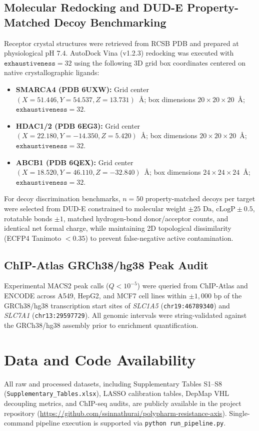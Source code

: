 \documentclass[11pt,a4paper]{article}
\begin{document}
\subsection{Molecular Redocking and DUD-E Property-Matched Decoy Benchmarking}
Receptor crystal structures were retrieved from RCSB PDB and prepared at physiological pH $7.4$. AutoDock Vina (v1.2.3) redocking was executed with $\texttt{exhaustiveness} = 32$ using the following 3D grid box coordinates centered on native crystallographic ligands:
\begin{itemize}
    \item \textbf{SMARCA4 (PDB 6UXW):} Grid center $(X = 51.446, Y = 54.537, Z = 13.731)$~\AA; box dimensions $20 \times 20 \times 20$~\AA; $\texttt{exhaustiveness} = 32$.
    \item \textbf{HDAC1/2 (PDB 6EG3):} Grid center $(X = 22.180, Y = -14.350, Z = 5.420)$~\AA; box dimensions $20 \times 20 \times 20$~\AA; $\texttt{exhaustiveness} = 32$.
    \item \textbf{ABCB1 (PDB 6QEX):} Grid center $(X = 18.520, Y = 46.110, Z = -32.840)$~\AA; box dimensions $24 \times 24 \times 24$~\AA; $\texttt{exhaustiveness} = 32$.
\end{itemize}
For decoy discrimination benchmarks, $n = 50$ property-matched decoys per target were selected from DUD-E \cite{dude2012} constrained to molecular weight $\pm 25\text{ Da}$, $\text{cLogP} \pm 0.5$, rotatable bonds $\pm 1$, matched hydrogen-bond donor/acceptor counts, and identical net formal charge, while maintaining 2D topological dissimilarity (ECFP4 Tanimoto $< 0.35$) to prevent false-negative active contamination.

\subsection{ChIP-Atlas GRCh38/hg38 Peak Audit}
Experimental MACS2 peak calls ($Q < 10^{-5}$) were queried from ChIP-Atlas \cite{chipatlas2022} and ENCODE across A549, HepG2, and MCF7 cell lines within $\pm 1,000$ bp of the GRCh38/hg38 transcription start sites of \textit{SLC1A5} (\texttt{chr19:46789340}) and \textit{SLC7A1} (\texttt{chr13:29597729}). All genomic intervals were string-validated against the GRCh38/hg38 assembly prior to enrichment quantification.

\section{Data and Code Availability}
All raw and processed datasets, including Supplementary Tables S1--S8 (\texttt{Supplementary\_Tables.xlsx}), LASSO calibration tables, DepMap VHL decoupling metrics, and ChIP-seq audits, are publicly available in the project repository (\url{https://github.com/ssinnathurai/polypharm-resistance-axis}). Single-command pipeline execution is supported via \texttt{python run\_pipeline.py}.
\end{document}
